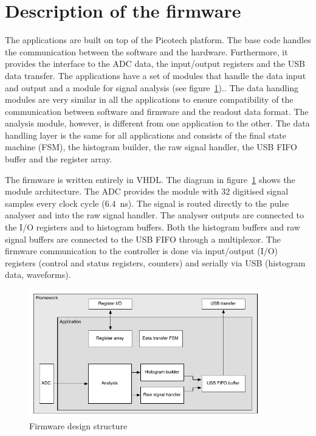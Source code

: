 \documentclass[12pt]{packages/mytustyle}  %
\begin{document}
\section{Description of the firmware}
The applications are built on top of the Picotech platform. The base code handles the communication between the software and the hardware. Furthermore, it provides the interface to the ADC data, the input/output registers and the USB data transfer. The applications have a set of modules that handle the data input and output and a module for signal analysis (see figure~\ref{fig:application}).. The data handling modules are very similar in all the applications to ensure compatibility of the communication between software and firmware and the readout data format. The analysis module, however, is different from one application to the other. The data handling layer is the same for all applications and consists of the final state machine (FSM), the histogram builder, the raw signal handler, the USB FIFO buffer and the register array.

The firmware is written entirely in VHDL. The diagram in figure~\ref{fig:application} shows the module architecture. The ADC provides the module with 32 digitised signal samples every clock cycle (6.4~ns). The signal is routed directly to the pulse analyser and into the raw signal handler. The analyser outputs are connected to the I/O registers and to histogram buffers. Both the histogram buffers and raw signal buffers are connected to the USB FIFO through a multiplexor. The firmware communication to the controller is done via input/output (I/O) registers (control and status registers, counters) and serially via USB (histogram data, waveforms). 


\begin{figure}[!t]
\centering
\includegraphics[width=0.9\textwidth]{plots/application}
\caption{Firmware design structure}
\label{fig:application}
\end{figure}
\end{document}
